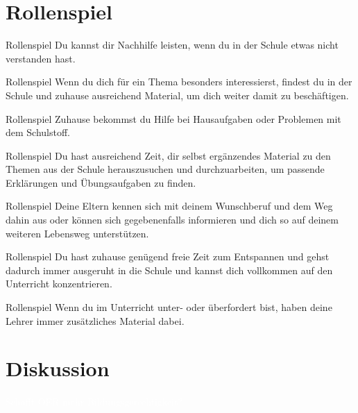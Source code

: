 \documentclass[14pt, usenames, dvipsnames, notes]{beamer}
\newcommand{\aussage}[1]{	\begin{frame}{Rollenspiel}
	\centering #1
	\end{frame}}
\begin{document}
\section{Rollenspiel}

	\aussage{Du kannst dir Nachhilfe leisten, wenn du in der Schule etwas nicht verstanden hast.}

	\aussage{Wenn du dich für ein Thema besonders interessierst, findest du in der Schule und zuhause ausreichend Material, um dich weiter damit zu beschäftigen.}

	\aussage{Zuhause bekommst du Hilfe bei Hausaufgaben oder Problemen mit dem Schulstoff.}

	\aussage{Du hast ausreichend Zeit, dir selbst ergänzendes Material zu den Themen aus der Schule herauszusuchen und durchzuarbeiten, um passende Erklärungen und Übungsaufgaben zu finden.}

	\aussage{Deine Eltern kennen sich mit deinem Wunschberuf und dem Weg dahin aus oder können sich gegebenenfalls informieren und dich so auf deinem weiteren Lebensweg unterstützen.}

	\aussage{Du hast zuhause genügend freie Zeit zum Entspannen und gehst dadurch immer ausgeruht in die Schule und kannst dich vollkommen auf den Unterricht konzentrieren.}
	
	\aussage{Wenn du im Unterricht unter- oder überfordert bist, haben deine Lehrer immer zusätzliches Material dabei.}

\section{Diskussion}



\begin{frame}{}
    \begin{center}
        \textcolor{white}{\LARGE Schafft OER mehr Bildungsgerechtigkeit?}
    \end{center}
\end{frame}
\end{document}
